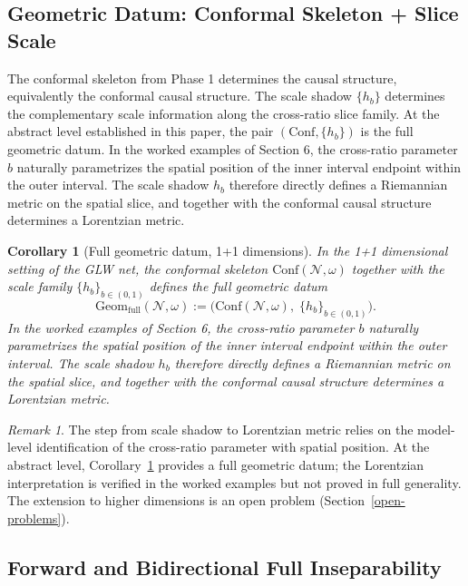 \documentclass[12pt]{article}
\newtheorem{corollary}[theorem]{Corollary}
\theoremstyle{definition}
\theoremstyle{remark}
\newtheorem{remark}[theorem]{Remark}
\begin{document}
\subsection{Geometric Datum: Conformal Skeleton + Slice
Scale}\label{assembly-conformal-skeleton-scale-lorentzian-geometry}

The conformal skeleton from Phase 1 determines the causal structure,
equivalently the conformal causal structure. The scale shadow
\(\{h_b\}\) determines the complementary scale information along the
cross-ratio slice family. At the abstract level established in this
paper, the pair \((\mathrm{Conf},\{h_b\})\) is the full geometric datum.
In the worked examples of Section 6, the cross-ratio parameter \(b\)
naturally parametrizes the spatial position of the inner interval
endpoint within the outer interval. The scale shadow \(h_b\) therefore
directly defines a Riemannian metric on the spatial slice, and together
with the conformal causal structure determines a Lorentzian metric.

\begin{corollary}[Full geometric datum, 1+1 dimensions]\label{cor:5.4}
In the 1+1
dimensional setting of the GLW net, the conformal skeleton
\(\mathrm{Conf}(\mathcal{N},\omega)\) together with the scale family
\(\{h_b\}_{b \in (0,1)}\) defines the full geometric datum \[
\mathrm{Geom}_{\mathrm{full}}(\mathcal{N},\omega)
:=
\big(\mathrm{Conf}(\mathcal{N},\omega),\; \{h_b\}_{b \in (0,1)}\big).
\]
In the worked examples of Section 6, the cross-ratio parameter \(b\)
naturally parametrizes the spatial position of the inner interval
endpoint within the outer interval. The scale shadow \(h_b\) therefore
directly defines a Riemannian metric on the spatial slice, and together
with the conformal causal structure determines a Lorentzian metric.
\end{corollary}

\begin{remark}
The step from scale shadow to Lorentzian metric relies on the
model-level identification of the cross-ratio parameter with spatial
position. At the abstract level, Corollary~\ref{cor:5.4} provides a
full geometric datum; the Lorentzian interpretation is verified in the
worked examples but not proved in full generality. The extension to
higher dimensions is an open problem (Section~\ref{open-problems}).
\end{remark}

\subsection{Forward and Bidirectional Full
Inseparability}\label{forward-and-bidirectional-full-inseparability}
\end{document}
